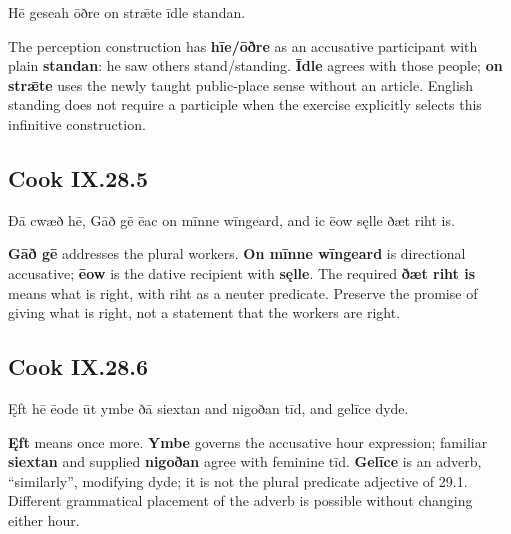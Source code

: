 \par\begin{minipage}{\linewidth}\raggedright
Hē geseah ōðre on strǣte īdle standan.

The perception construction has \textbf{hīe/\allowbreak{}ōðre} as an accusative participant with plain \textbf{standan}: he saw others stand/\allowbreak{}standing. \textbf{Īdle} agrees with those people; \textbf{on strǣte} uses the newly taught public-place sense without an article. English standing does not require a participle when the exercise explicitly selects this infinitive construction.

\end{minipage}\par\addvspace{4pt}

\subsection*{Cook IX.28.5}

\par\begin{minipage}{\linewidth}\raggedright
Ðā cwæð hē, Gāð gē ēac on mīnne wīngeard, and ic ēow sęlle ðæt riht is.

\textbf{Gāð gē} addresses the plural workers. \textbf{On mīnne wīngeard} is directional accusative; \textbf{ēow} is the dative recipient with \textbf{sęlle}. The required \textbf{ðæt riht is} means what is right, with riht as a neuter predicate. Preserve the promise of giving what is right, not a statement that the workers are right.

\end{minipage}\par\addvspace{4pt}

\subsection*{Cook IX.28.6}

\par\begin{minipage}{\linewidth}\raggedright
Ęft hē ēode ūt ymbe ðā siextan and nigoðan tīd, and gelīce dyde.

\textbf{Ęft} means once more. \textbf{Ymbe} governs the accusative hour expression; familiar \textbf{siextan} and supplied \textbf{nigoðan} agree with feminine tīd. \textbf{Gelīce} is an adverb, “similarly”, modifying dyde; it is not the plural predicate adjective of 29.1. Different grammatical placement of the adverb is possible without changing either hour.

\end{minipage}\par\addvspace{4pt}

